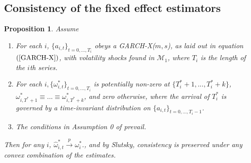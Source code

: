 \documentclass[11pt]{article}
\def\mc#1{\mathcal{#1}} %
\def\E{\mathbb{E}} %
\def\mc#1{\mathcal{#1}}
\newtheorem{prop}{Proposition}
\theoremstyle{definition}
\newenvironment{proof-of-proposition}[1][{}]{\noindent{\bf
    Proof of Proposition {#1}}
  \hspace*{.5em}}{\qed\bigskip\\}
\begin{document}

\subsection{Consistency of the fixed effect estimators}

\begin{prop}\label{omega_consistency}
Assume
\begin{enumerate}
  \item For each $i$, $\{a_{i,t}\}_{t=0,...,T_i}$ obeys a GARCH-X($m,s$), as laid out in equation $(\ref{GARCH-X})$, with volatility shocks found in $\mc{M}_{1}$, where $T_i$ is the length of the $i$th series.
  \item For each $i, \{\omega_{i,t}^{*}\}_{t=0,...,T_i}$ is potentially non-zero at $\{T^{*}_{i}+1,... ,T^{*}_{i}+k\}$, $\omega_{i,T^{*}+1}^{*}\equiv...\equiv\omega_{i,T^{*}+k}^{*}$, and zero otherwise, where the arrival of $T_{i}^{*}$ is governed by a time-invariant distribution on $\{a_{i,t}\}_{t=0,...,T_i-1}$. \label{stationarity_of_omega_i_t}
  \item The conditions in Assumption 0 of \citet{han2014asymptotic} prevail.
\end{enumerate}
Then for any $i$, $\hat\omega_{i,t}^{*} \xrightarrow{p} \omega_{i}^{*}$., and by Slutsky, consistency is preserved under any convex combination of the estimates.
\end{prop}
\end{document}
